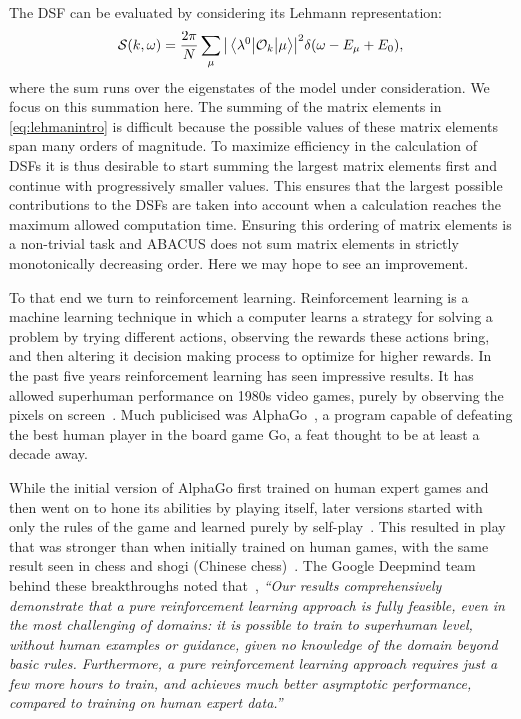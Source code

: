 \documentclass[11pt, a4paper]{report} %
\begin{document}
The DSF can be evaluated by considering its Lehmann representation:
\begin{equation}\label{eq:lehmanintro}
  \mathcal{S}(k,\omega) = \frac{2\pi}{N}\sum_{\mu}\abs{\mel{\lambda^0}{\mathcal{O}_k}{\mu}}^2 \delta\qty(\omega-E_{\mu}+E_0), 
\end{equation}
where the sum runs over the eigenstates of the model under consideration.
We focus on this summation here.
The summing of the matrix elements in \cref{eq:lehmanintro} is difficult because the possible values of these matrix elements span many orders of magnitude.
To maximize efficiency in the calculation of DSFs it is thus desirable to start summing the largest matrix elements first and continue with progressively smaller values.
This ensures that the largest possible contributions to the DSFs are taken into account when a calculation reaches the maximum allowed computation time.
Ensuring this ordering of matrix elements is a non-trivial task and ABACUS does not sum matrix elements in strictly monotonically decreasing order.
Here we may hope to see an improvement.

To that end we turn to reinforcement learning.
Reinforcement learning is a machine learning technique in which a computer learns a strategy for solving a problem by trying different actions, observing the rewards these actions bring, and then altering it decision making process to optimize for higher rewards.
In the past five years reinforcement learning has seen impressive results.
It has allowed superhuman performance on 1980s video games, purely by observing the pixels on screen~\cite{mnih13_playin_atari_with_deep_reinf_learn,mnih15_human_level_contr_throug_deep_reinf_learn}.
Much publicised was AlphaGo~\cite{silver16_master_game_go_with_deep}, a program capable of defeating the best human player in the board game Go, a feat thought to be at least a decade away.

While the initial version of AlphaGo first trained on human expert games and then went on to hone its abilities by playing itself, later versions started with only the rules of the game and learned purely by self-play~\cite{Silver2017a}.
This resulted in play that was stronger than when initially trained on human games, with the same result seen in chess and shogi (Chinese chess)~\cite{Silver2017}.
The Google Deepmind team behind these breakthroughs noted that~\cite{Silver2017a}, \textit{``Our results comprehensively demonstrate that a pure reinforcement learning approach is fully feasible, even in the most challenging of domains: it is possible to train to superhuman level, without human examples or guidance, given no knowledge of the domain beyond basic rules. Furthermore, a pure reinforcement learning approach requires just a few more hours to train, and achieves much better asymptotic performance, compared to training on human expert data.''}
\end{document}
